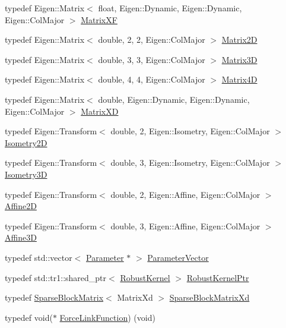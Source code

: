 \begin{DoxyCompactItemize}
typedef Eigen\+::\+Matrix$<$ float, Eigen\+::\+Dynamic, Eigen\+::\+Dynamic, Eigen\+::\+Col\+Major $>$ \hyperlink{namespaceg2o_a9cf1a3355d8ef3a852aa23866754758c}{Matrix\+XF}
\item 
typedef Eigen\+::\+Matrix$<$ double, 2, 2, Eigen\+::\+Col\+Major $>$ \hyperlink{namespaceg2o_ab45dbd73bc096222cf5688ea45b04eba}{Matrix2D}
\item 
typedef Eigen\+::\+Matrix$<$ double, 3, 3, Eigen\+::\+Col\+Major $>$ \hyperlink{namespaceg2o_ae968373755b3be75547f97573021dc8a}{Matrix3D}
\item 
typedef Eigen\+::\+Matrix$<$ double, 4, 4, Eigen\+::\+Col\+Major $>$ \hyperlink{namespaceg2o_aed3721c4efdc0f727e94569cc22ddd42}{Matrix4D}
\item 
typedef Eigen\+::\+Matrix$<$ double, Eigen\+::\+Dynamic, Eigen\+::\+Dynamic, Eigen\+::\+Col\+Major $>$ \hyperlink{namespaceg2o_a8a808fe01b0b4e0afe637fe680853d0a}{Matrix\+XD}
\item 
typedef Eigen\+::\+Transform$<$ double, 2, Eigen\+::\+Isometry, Eigen\+::\+Col\+Major $>$ \hyperlink{namespaceg2o_a24614fc78fff981b779fbf4850b19101}{Isometry2D}
\item 
typedef Eigen\+::\+Transform$<$ double, 3, Eigen\+::\+Isometry, Eigen\+::\+Col\+Major $>$ \hyperlink{namespaceg2o_af8f6c8f7db82618f6bab6bbe448806eb}{Isometry3D}
\item 
typedef Eigen\+::\+Transform$<$ double, 2, Eigen\+::\+Affine, Eigen\+::\+Col\+Major $>$ \hyperlink{namespaceg2o_ad7410532a9e2e255e93781c6beb0feb8}{Affine2D}
\item 
typedef Eigen\+::\+Transform$<$ double, 3, Eigen\+::\+Affine, Eigen\+::\+Col\+Major $>$ \hyperlink{namespaceg2o_ab3cae84956b78f00b9091c56c42af5eb}{Affine3D}
\item 
typedef std\+::vector$<$ \hyperlink{classg2o_1_1Parameter}{Parameter} $\ast$ $>$ \hyperlink{namespaceg2o_a85cc8f2c7db8cab47b2b269a7acd6785}{Parameter\+Vector}
\item 
typedef std\+::tr1\+::shared\+\_\+ptr$<$ \hyperlink{classg2o_1_1RobustKernel}{Robust\+Kernel} $>$ \hyperlink{namespaceg2o_a0802a5e01a6b1861ae01013220dec6ac}{Robust\+Kernel\+Ptr}
\item 
typedef \hyperlink{classg2o_1_1SparseBlockMatrix}{Sparse\+Block\+Matrix}$<$ Matrix\+Xd $>$ \hyperlink{namespaceg2o_a268218b758e93d6d13f8d35a327a650a}{Sparse\+Block\+Matrix\+Xd}
\item 
typedef void($\ast$ \hyperlink{namespaceg2o_a3be76fea59d320255e89425439f18f48}{Force\+Link\+Function}) (void)
\item 

\end{DoxyCompactItemize}
